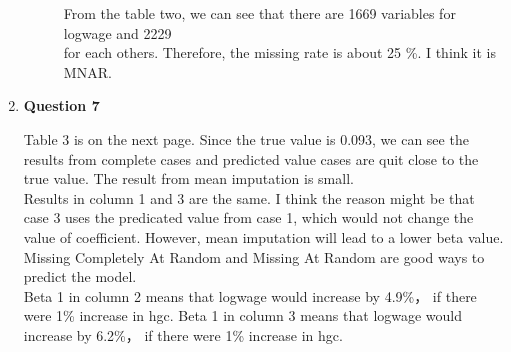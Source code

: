 \documentclass[11pt,a4paper]{article}
\begin{document}
\begin{enumerate}
\begin{description}
From the table two, we can see that there are 1669 variables for logwage and 2229 \\for each others. Therefore, the missing rate is about 25 \%. I think it is MNAR.
          \end{description}
          
    \item \textbf{Question 7}
		  \begin{description}
		  Table 3 is on the next page. Since the true value is 0.093, we can see the results from complete cases and predicted value cases are quit close to the true value. The result from mean imputation is small. \\
		  Results in column 1 and 3 are the same. I think the reason might be that case 3 uses the predicated value from case 1, which would not change the value of coefficient. However, mean imputation will lead to a lower beta value.  Missing Completely At Random and Missing At Random are good ways to predict the model.\\
		  Beta 1 in column 2 means that logwage would increase by 4.9\%， if there were 1\% increase in hgc. Beta 1 in column 3 means that logwage would increase by 6.2\%， if there were 1\% increase in hgc.


\end{description}
\end{enumerate}
\end{document}
